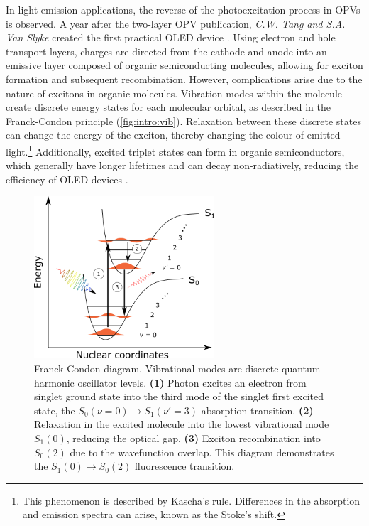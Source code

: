 In light emission applications, the reverse of the photoexcitation process in \acp{OPV} is observed. A year after the two-layer \ac{OPV} publication, \emph{C.W. Tang and S.A. Van Slyke} created the first practical \ac{OLED} device \citep{Tang1987}. Using electron and hole transport layers, charges are directed from the cathode and anode into an emissive layer composed of organic semiconducting molecules, allowing for exciton formation and subsequent recombination. However, complications arise due to the nature of excitons in organic molecules. Vibration modes within the molecule create discrete energy states for each molecular orbital, as described in the Franck-Condon principle (\autoref{fig:intro:vib}). Relaxation between these discrete states can change the energy of the exciton, thereby changing the colour of emitted light.\footnote{This phenomenon is described by Kascha's rule. Differences in the absorption and emission spectra can arise, known as the Stoke's shift.} Additionally, excited triplet states can form in organic semiconductors, which generally have longer lifetimes and can decay non-radiatively, reducing the efficiency of \ac{OLED} devices \citep{kohler2009triplet}. 

\begin{figure}[t]
    \centering
    \includegraphics[width=0.6\textwidth]{pictures/franck_condon_transitions.png}
    \caption{Franck-Condon diagram. Vibrational modes are discrete quantum harmonic oscillator levels. \textbf{(1)} Photon excites an electron from singlet ground state into the third mode of the singlet first excited state, the $S_0(\nu=0) \rightarrow S_1(\nu'=3)$ absorption transition. \textbf{(2)} Relaxation in the excited molecule into the lowest vibrational mode $S_1(0)$, reducing the optical gap. \textbf{(3)} Exciton recombination into $S_0(2)$ due to the wavefunction overlap. This diagram demonstrates the $S_1(0) \rightarrow S_0(2)$ fluorescence transition.}
    \label{fig:intro:vib}
\end{figure}



